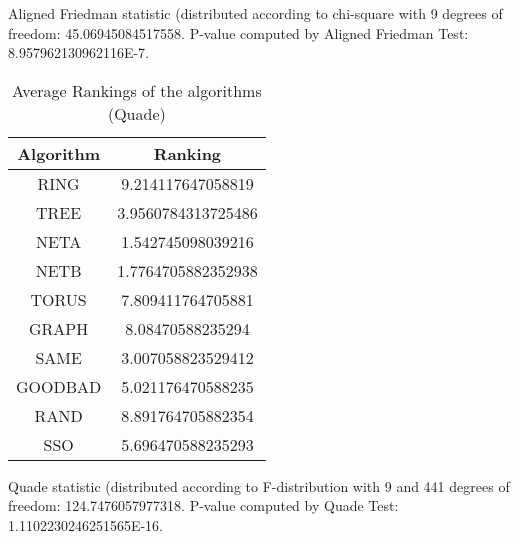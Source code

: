 \documentclass[a4paper,10pt]{article}
\begin{document}
\begin{landscape}
Aligned Friedman statistic (distributed according to chi-square with 9 degrees of freedom: 45.06945084517558. 
P-value computed by Aligned Friedman Test: 8.957962130962116E-7.\newline


\newpage

\begin{table}[!htp]
\centering
\caption{Average Rankings of the algorithms (Quade)
}\begin{tabular}{c|c}
Algorithm&Ranking\\
\hline
 RING&9.214117647058819\\
 TREE&3.9560784313725486\\
 NETA&1.542745098039216\\
 NETB&1.7764705882352938\\
 TORUS&7.809411764705881\\
 GRAPH&8.08470588235294\\
 SAME&3.007058823529412\\
 GOODBAD&5.021176470588235\\
 RAND&8.891764705882354\\
 SSO&5.696470588235293\\
\end{tabular}
\end{table}
Quade statistic (distributed according to F-distribution with 9 and 441 degrees of freedom: 124.7476057977318. 
P-value computed by Quade Test: 1.1102230246251565E-16.\newline


\newpage


\end{landscape}
\end{document}
